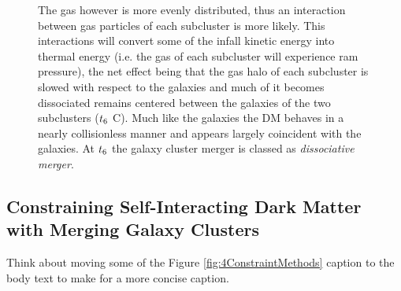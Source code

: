 \begin{figure}
{The gas however is more evenly distributed, thus an interaction between gas particles of each subcluster is more likely.
This interactions will convert some of the infall kinetic energy into thermal energy (i.e. the gas of each subcluster will experience ram pressure), the net effect being that the gas halo of each subcluster is slowed with respect to the galaxies and much of it becomes dissociated remains centered between the galaxies of the two subclusters ($t_{\rm 6}$ C).
Much like the galaxies the DM behaves in a nearly collisionless manner and appears largely coincident with the galaxies.
At $t_{\rm 6}$ the galaxy cluster merger is classed as \emph{dissociative merger}.
\label{fig:MergerTimeSeries}}
\end{figure}  

\subsection{Constraining Self-Interacting Dark Matter with Merging Galaxy Clusters}

Think about moving some of the Figure \ref{fig:4ConstraintMethods} caption to the body text to make for a more concise caption.

